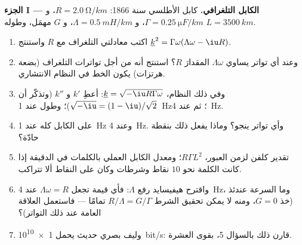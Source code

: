 \begin{problem}
\label{pb:b2:dispersion-wave-packets:1}

\medskip
\noindent\textbf{الجزء I --- الكابل التلغرافي.}
كابل الأطلسي سنة 1866: $R = \qty{2.0}{\ohm/km}$، و $\Gamma = \qty{0.25}{\micro F/km}$،
و $\Lambda = \qty{0.5}{mH/km}$، و $G$ مهمَل، وطوله $L = \qty{3500}{km}$.
\begin{enumerate}
  \item اكتب معادلتي التلغراف مع $R$ واستنتج
         $\underline k^2 = \Gamma\omega(\Lambda\omega - \iu R)$.
  \item وعند أي تواتر يساوي $\Lambda\omega$ المقدارَ $R$؟ استنتج أنه من أجل
        تواترات التلغراف (بضعة هرتزات) يكون الخط في
        النظام الانتشاري.
  \item وفي ذلك النظام، $\underline k = \sqrt{-\iu R\Gamma\omega}$: أعطِ $k'$ و $k''$
        (وتذكّر أن $\sqrt{-\iu} = (1 - \iu)/\sqrt2$)؛  وطول
         عند \qty{1}{Hz}؛ ثم عند \qty{4}{Hz}.
  \item {}  على الكابل كله عند \qty{1}{Hz} وعند
        \qty{4}{Hz}. وأي تواتر ينجو؟ وماذا يفعل ذلك بنقطة
        حادّة؟
  \item تقدير كلفن لزمن العبور، $R\Gamma L^2$؛ ومعدل الكابل
        العملي بالكلمات في الدقيقة إذا كانت الكلمة نحو
        $10$ نقاط وشرطات وكان على النقاط ألا تتراكب.
  \item واقترح هيفيسايد رفع $\Lambda$: فأي قيمة تجعل $\Lambda\omega = R$
        عند \qty{4}{Hz}، وما السرعة  عندئذ
        (خذ $G = 0$، ومنه لا يمكن تحقيق الشرط $R/\Lambda = G/\Gamma$
        تمامًا --- فاستعمل العلاقة العامة عند ذلك التواتر)؟
  \item وليف بصري حديث يحمل \qty{1e10}{bit/s}: قارن ذلك
        بالسؤال 5، بقوى العشرة.
\end{enumerate}


\end{problem}
